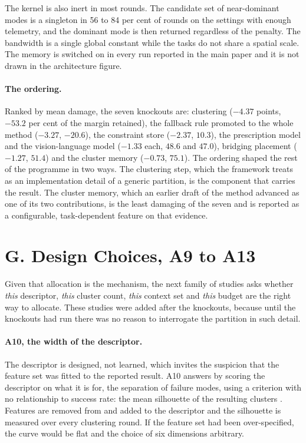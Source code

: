 \documentclass[letterpaper]{article}
\begin{document}
The kernel is also inert in most rounds. The candidate set of near-dominant modes is a
singleton in 56 to 84 per cent of rounds on the settings with enough telemetry, and the
dominant mode is then returned regardless of the penalty. The bandwidth is a single
global constant while the tasks do not share a spatial scale. The memory is switched on
in every run reported in the main paper and it is not drawn in the architecture figure.

\paragraph{The ordering.} Ranked by mean damage, the seven knockouts are: clustering
($-4.37$ points, $-53.2$ per cent of the margin retained), the fallback rule promoted to
the whole method ($-3.27$, $-20.6$), the constraint store ($-2.37$, $10.3$), the
prescription model and the vision-language model ($-1.33$ each, $48.6$ and $47.0$),
bridging placement ($-1.27$, $51.4$) and the cluster memory ($-0.73$, $75.1$). The
ordering shaped the rest of the programme in two ways. The clustering step, which the
framework treats as an implementation detail of a generic partition, is the component
that carries the result. The cluster memory, which an earlier draft of the method
advanced as one of its two contributions, is the least damaging of the seven and is
reported as a configurable, task-dependent feature on that evidence.

\section{G. Design Choices, A9 to A13}

Given that allocation is the mechanism, the next family of studies asks whether
\emph{this} descriptor, \emph{this} cluster count, \emph{this} context set and
\emph{this} budget are the right way to allocate. These studies were added after the
knockouts, because until the knockouts had run there was no reason to interrogate the
partition in such detail.

\paragraph{A10, the width of the descriptor.} The descriptor is designed, not learned,
which invites the suspicion that the feature set was fitted to the reported result. A10
answers by scoring the descriptor on what it is for, the separation of failure modes,
using a criterion with no relationship to success rate: the mean silhouette of the
resulting clusters \citep{rousseeuw1987silhouette}. Features are removed from and added
to the descriptor and the silhouette is measured over every clustering round. If the
feature set had been over-specified, the curve would be flat and the choice of six
dimensions arbitrary.
\end{document}
